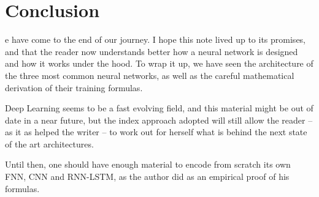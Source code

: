\chapter{Conclusion}

e have come to the end of our journey. I hope this note lived up to its promises, and that the reader now understands better how a neural network is designed and how it works under the hood. To wrap it up, we have seen the architecture of the three most common neural networks, as well as the careful mathematical derivation of their training formulas.

\vspace{0.2cm}

Deep Learning seems to be a fast evolving field, and this material might be out of date in a near future, but the index approach adopted will still allow the reader -- as it as helped the writer -- to work out for herself what is behind the next state of the art architectures.

\vspace{0.2cm}

Until then, one should have enough material to encode from scratch its own FNN, CNN and RNN-LSTM, as the author did as an empirical proof of his formulas.

